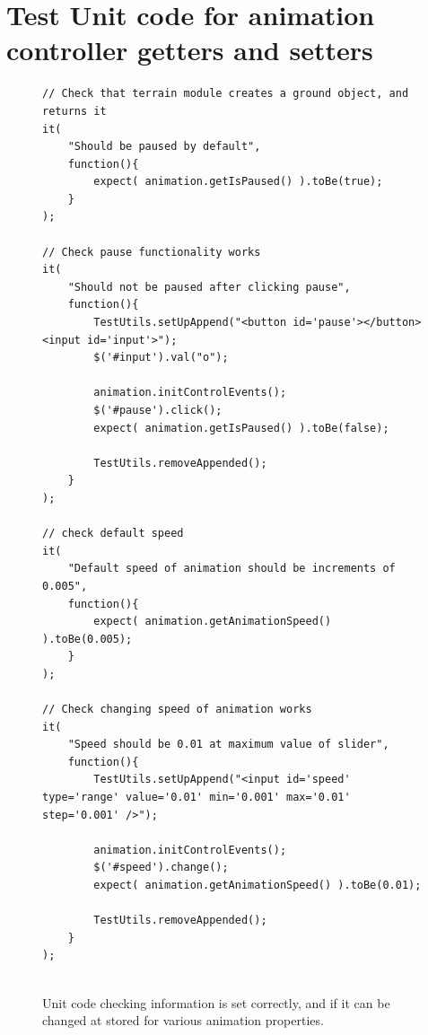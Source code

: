 \section{Test Unit code for animation controller getters and setters}
\label{test:animation}
\begin{figure}[h!]
\caption{Unit code checking information is set correctly, and if it can be changed at stored for various animation properties.}
\begin{lstlisting}
// Check that terrain module creates a ground object, and returns it
it(
    "Should be paused by default",
    function(){
        expect( animation.getIsPaused() ).toBe(true);
    }
);

// Check pause functionality works
it(
    "Should not be paused after clicking pause",
    function(){
        TestUtils.setUpAppend("<button id='pause'></button><input id='input'>");
        $('#input').val("o");

        animation.initControlEvents();
        $('#pause').click();
        expect( animation.getIsPaused() ).toBe(false);

        TestUtils.removeAppended();
    }
);

// check default speed
it(
    "Default speed of animation should be increments of 0.005",
    function(){
        expect( animation.getAnimationSpeed() ).toBe(0.005);
    }
);

// Check changing speed of animation works
it(
    "Speed should be 0.01 at maximum value of slider",
    function(){
        TestUtils.setUpAppend("<input id='speed' type='range' value='0.01' min='0.001' max='0.01' step='0.001' />");

        animation.initControlEvents();
        $('#speed').change();
        expect( animation.getAnimationSpeed() ).toBe(0.01);

        TestUtils.removeAppended();
    }
);
            
\end{lstlisting}
\end{figure}

\clearpage

